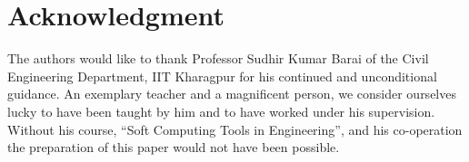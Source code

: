 \documentclass[conference]{IEEEtran}
\newcommand{\quotes}[1]{``#1''}
\begin{document}
\section*{Acknowledgment}
The authors would like to thank Professor Sudhir Kumar Barai of the Civil Engineering Department, IIT Kharagpur for his continued and unconditional guidance. An exemplary teacher and a magnificent person, we consider ourselves lucky to have been taught by him and to have worked under his supervision. Without his course, \quotes{Soft Computing Tools in Engineering}, and his co-operation the preparation of this paper would not have been possible.


\ifCLASSOPTIONcaptionsoff
  \newpage
\fi




\end{document}
